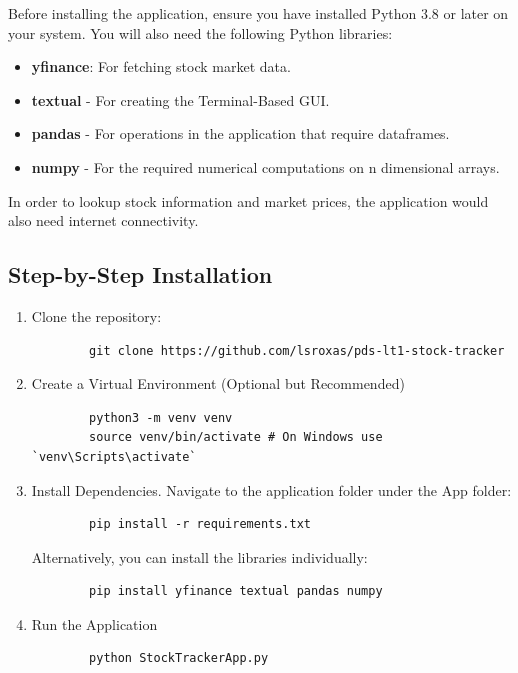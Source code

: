 \documentclass{article}
\begin{document}
Before installing the application, ensure you have installed Python 3.8 or later on your system. You will also need the following Python libraries:
\begin{itemize}
    \item \textbf{yfinance}: For fetching stock market data.
    \item \textbf{textual} - For creating the Terminal-Based GUI.
    \item \textbf{pandas}  - For operations in the application that require dataframes.
    \item \textbf{numpy} - For the required numerical computations on n dimensional arrays.
\end{itemize}
In order to lookup stock information and market prices, the application would also need internet connectivity. 


\subsection{Step-by-Step Installation}

\begin{enumerate}
    \item Clone the repository:
    \begin{lstlisting}
        git clone https://github.com/lsroxas/pds-lt1-stock-tracker
    \end{lstlisting}
    \item Create a Virtual Environment (Optional but Recommended)
    \begin{lstlisting}
        python3 -m venv venv
        source venv/bin/activate # On Windows use `venv\Scripts\activate`
    \end{lstlisting}
    \item Install Dependencies. Navigate to the application folder under the App folder:
    \begin{lstlisting}
        pip install -r requirements.txt
    \end{lstlisting}
    Alternatively, you can install the libraries individually:
    \begin{lstlisting}
        pip install yfinance textual pandas numpy
    \end{lstlisting}
    \item Run the Application
    \begin{lstlisting}
        python StockTrackerApp.py
    \end{lstlisting}
\end{enumerate}
\end{document}
